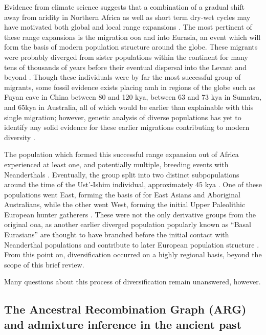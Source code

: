 Evidence from climate science suggests that a combination of a gradual shift away from aridity in Northern Africa as well as short term dry-wet cycles may have motivated both global and local range expansions \cite{Schaebitz2021, Timmermann2016}. The most pertinent of these range expansions is the migration \gls{ooa} and into Eurasia, an event which will form the basis of modern population structure around the globe. These migrants were probably diverged from sister populations within the continent for many tens of thousands of years before their eventual dispersal into the Levant and beyond \cite{Bergstrom2019, Schiffels2014}. Though these individuals were by far the most successful group of migrants, some fossil evidence exists placing \gls{amh} in regions of the globe such as Fuyan cave in China between 80 and 120 \gls{kya}, between 63 and 73 \gls{kya} in Sumatra, and 65\gls{kya} in Australia, all of which would be earlier than explainable with this single migration; however, genetic analysis of diverse populations has yet to identify any solid evidence for these earlier migrations contributing to modern diversity \cite{Skoglund2018}.

The population which formed this successful range expansion out of Africa experienced at least one, and potentially multiple, breeding events with Neanderthals \cite{Sankararaman2012}. Eventually, the group split into two distinct subpopulations around the time of the Ust'-Ishim individual, approximately 45 \gls{kya} \cite{Fu2014}. One of these populations went East, forming the basis of for East Asians and Aboriginal Australians, while the other went West, forming the initial Upper Paleolithic European hunter gatherers \cite{Skoglund2017,Lipson2017}. These were not the only derivative groups from the original \gls{ooa}, as another earlier diverged population popularly known as ``Basal Eurasians'' are thought to have branched before the initial contact with Neanderthal populations and contribute to later European population structure \cite{Lazaridis2014}. From this point on, diversification occurred on a highly regional basis, beyond the scope of this brief review. 

Many questions about this process of diversification remain unanswered, however. 


\subsection{The Ancestral Recombination Graph (ARG) and admixture inference in the ancient past}

